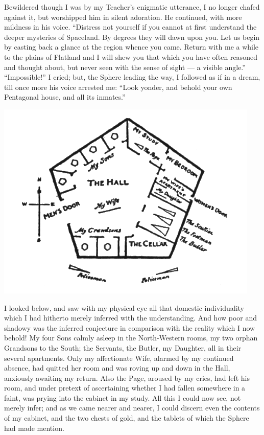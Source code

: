 \documentclass[12pt, a4paper, oneside]{memoir}
\begin{document}
Bewildered though I was by my Teacher's enigmatic utterance, I no longer
chafed against it, but worshipped him in silent adoration. He continued, with
more mildness in his voice. ``Distress not yourself if you cannot at first
understand the deeper mysteries of Spaceland. By degrees they will dawn upon
you. Let us begin by casting back a glance at the region whence you came.
Return with me a while to the plains of Flatland and I will shew you that
which you have often reasoned and thought about, but never seen with the sense
of sight --- a visible angle.'' ``Impossible!'' I cried; but, the Sphere leading
the way, I followed as if in a dream, till once more his voice arrested me:
``Look yonder, and behold your own Pentagonal house, and all its inmates.''
\begin{center}
\includegraphics[trim=20mm 0mm 20mm 0mm,scale=0.7]{fig9}
\end{center}


I looked below, and saw with my physical eye all that domestic individuality
which I had hitherto merely inferred with the understanding. And how poor and
shadowy was the inferred conjecture in comparison with the reality which I now
behold! My four Sons calmly asleep in the North-Western rooms, my two orphan
Grandsons to the South; the Servants, the Butler, my Daughter, all in their
several apartments. Only my affectionate Wife, alarmed by my continued
absence, had quitted her room and was roving up and down in the Hall,
anxiously awaiting my return. Also the Page, aroused by my cries, had left his
room, and under pretext of ascertaining whether I had fallen somewhere in a
faint, was prying into the cabinet in my study. All this I could now see, not
merely infer; and as we came nearer and nearer, I could discern even the
contents of my cabinet, and the two chests of gold, and the tablets of which
the Sphere had made mention.
\end{document}
